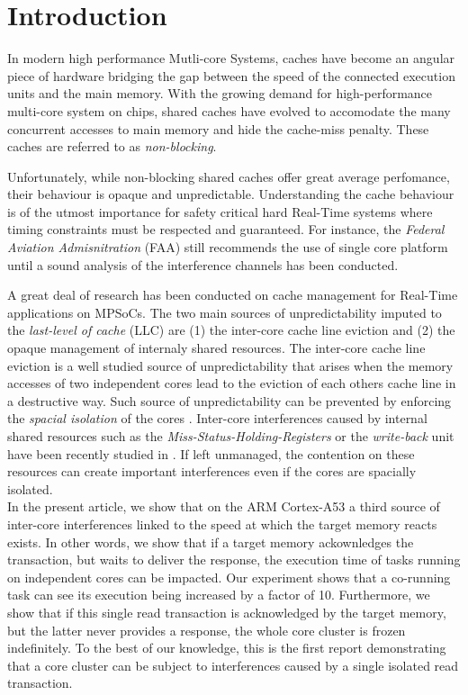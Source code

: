 \section{Introduction}
    In modern high performance Mutli-core Systems, caches have become an angular piece of hardware bridging the gap between the speed of the connected execution units and the main memory.
    With the growing demand for high-performance multi-core system on chips, shared caches have evolved to accomodate the many concurrent accesses to main memory and hide the cache-miss penalty.
    These caches are referred to as \emph{non-blocking}.

    Unfortunately, while non-blocking shared caches offer great average perfomance, their behaviour is opaque and unpredictable.
    Understanding the cache behaviour is of the utmost importance for safety critical hard Real-Time systems where timing constraints must be respected and guaranteed. For instance, the \emph{Federal Aviation Admisnitration} (FAA) \cite{faa} still recommends the use of single core platform until a sound analysis of the interference channels has been conducted.

    A great deal of research has been conducted on cache management for Real-Time applications on MPSoCs.
    The two main sources of unpredictability imputed to the \emph{last-level of cache} (LLC) are (1) the inter-core cache line eviction and (2) the opaque management of internaly shared resources.
    The inter-core cache line eviction is a well studied source of unpredictability that arises when the memory accesses of two independent cores lead to the eviction of each others cache line in a destructive way.
    Such source of unpredictability can be prevented by enforcing the \emph{spacial isolation} of the cores \cite{Mancuso2013RealtimeCM, 6755286}.
    Inter-core interferences caused by internal shared resources such as the \emph{Miss-Status-Holding-Registers} or the \emph{write-back} unit have been recently studied in \cite{Valsan2017AddressingIC, Heechul_DDOS_attacks_on_shared_cache}.
    If left unmanaged, the contention on these resources can create important interferences even if the cores are spacially isolated.\\

    In the present article, we show that on the ARM Cortex-A53 \cite{ARM-cortex-A53} a third source of inter-core interferences linked to the speed at which  the target memory reacts exists.
    In other words, we show that if a target memory ackownledges the transaction, but waits to deliver the response, the execution time of tasks running on independent cores can be impacted.
    Our experiment shows that a co-running task can see its execution being increased by a factor of 10.
    Furthermore, we show that if this single read transaction is acknowledged by the target memory, but the latter never provides a response, the whole core cluster is frozen indefinitely.
    To the best of our knowledge, this is the first report demonstrating that a core cluster can be subject to interferences caused by a single isolated read transaction.
